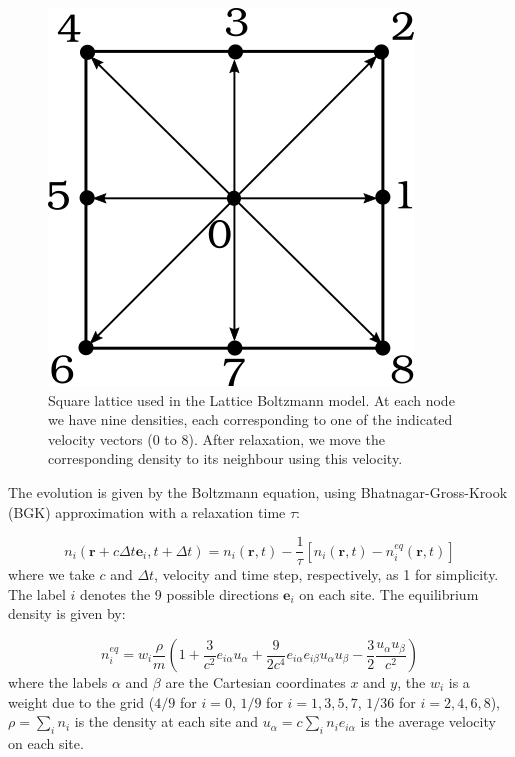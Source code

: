 \documentclass[aps,prl,reprint,groupedaddress]{revtex4-1}
\begin{document}
\begin{figure}[hb]
	\includegraphics[scale=0.3]{array.png}
	\caption{Square lattice used in the Lattice Boltzmann model. At each node we have nine densities, each corresponding to one of the indicated velocity vectors (0 to 8). After relaxation, we move the corresponding density to its neighbour using this velocity. \label{lattice}}
\end{figure} 

The evolution is given by the Boltzmann equation, using Bhatnagar-Gross-Krook (BGK) approximation with a relaxation time $\tau$:

\begin{equation} \label{relax}
n_{i}(\mathbf{r}+c\Delta t\mathbf{e}_{i},t+\Delta t) = n_{i}(\mathbf{r},t)-\frac{1}{\tau}\left [n_{i}(\mathbf{r},t)-n_{i}^{eq}(\mathbf{r},t)  \right ]
\end{equation}
where we take $c$ and $\Delta t$, velocity and time step, respectively, as 1 for simplicity. The label $i$ denotes the 9 possible directions $\mathbf{e}_{i}$ on each site.  The equilibrium density is given by:

\begin{equation} \label{equil}
n_i^{eq} = w_i\frac{\rho}{m}\left(1+\frac{3}{c^2}e_{i\alpha}u_\alpha + \frac{9}{2c^4}e_{i\alpha}e_{i\beta}u_\alpha u_\beta - \frac{3}{2}\frac{u_\alpha u_\beta}{c^2}\right)
\end{equation}
where the labels $\alpha$ and $\beta$ are the Cartesian coordinates $x$ and $y$, the $w_i$ is a weight due to the grid ($4/9$ for $i=0$, $1/9$ for $i=1,3,5,7$, $1/36$ for $i=2,4,6,8$), $\rho = \sum_i n_i$ is the density at each site and $u_{\alpha} = c \sum_i n_i e_{i\alpha}$ is the average velocity on each site.
\end{document}
